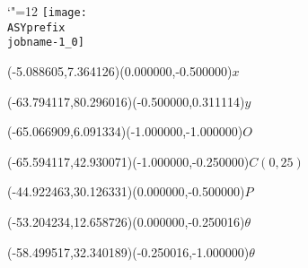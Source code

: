 \setlength{\unitlength}{1pt}%
\makeatletter%
\let\ASYencoding\f@encoding%
\let\ASYfamily\f@family%
\let\ASYseries\f@series%
\let\ASYshape\f@shape%
\makeatother%
{\catcode`"=12%
\texttt{[image: \\ASYprefix\\jobname-1\_0]}%
}%
%
\fontsize{6.000000}{7.200000}\selectfont%
\usefont{\ASYencoding}{\ASYfamily}{\ASYseries}{\ASYshape}%
\ASYalign(-5.088605,7.364126)(0.000000,-0.500000){$x$}%
%
\fontsize{6.000000}{7.200000}\selectfont%
\ASYalign(-63.794117,80.296016)(-0.500000,0.311114){$y$}%
%
\fontsize{6.000000}{7.200000}\selectfont%
\ASYalign(-65.066909,6.091334)(-1.000000,-1.000000){$O$}%
%
\fontsize{6.000000}{7.200000}\selectfont%
\ASYalign(-65.594117,42.930071)(-1.000000,-0.250000){$C(0, 25)$}%
%
\fontsize{6.000000}{7.200000}\selectfont%
\ASYalign(-44.922463,30.126331)(0.000000,-0.500000){$P$}%
%
\fontsize{6.000000}{7.200000}\selectfont%
\ASYalign(-53.204234,12.658726)(0.000000,-0.250016){$\theta$}%
%
\fontsize{6.000000}{7.200000}\selectfont%
\ASYalign(-58.499517,32.340189)(-0.250016,-1.000000){$\theta$}%
